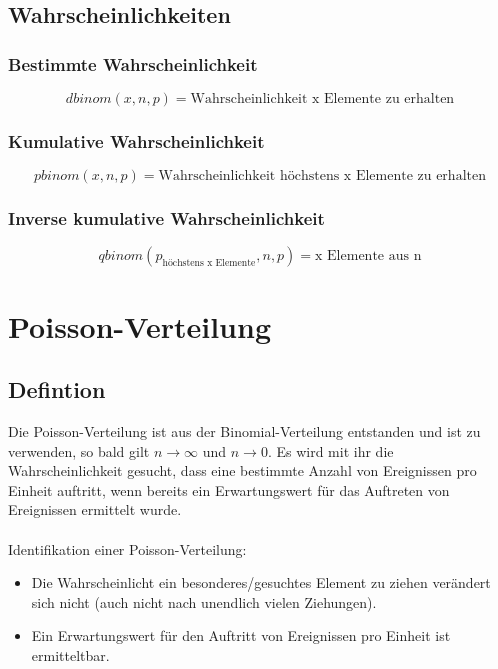 \documentclass[a4paper,10pt]{article}
\begin{document}
\subsection{Wahrscheinlichkeiten}
\subsubsection{Bestimmte Wahrscheinlichkeit}
\begin{equation}
  \label{eq:3}
  dbinom(x, n, p) = \text{Wahrscheinlichkeit x Elemente zu erhalten}
\end{equation}

\subsubsection{Kumulative Wahrscheinlichkeit}
\begin{equation}
  \label{eq:4}
  pbinom(x, n, p) = \text{Wahrscheinlichkeit höchstens x Elemente zu erhalten}
\end{equation}

\subsubsection{Inverse kumulative Wahrscheinlichkeit}
\begin{equation}
  \label{eq:5}
  qbinom(p_{\text{höchstens x Elemente}}, n, p) = \text{x Elemente aus n}
\end{equation}

\section{Poisson-Verteilung}
\subsection{Defintion}
Die Poisson-Verteilung ist aus der Binomial-Verteilung entstanden und
ist zu verwenden, so bald gilt $ n \rightarrow \infty $ und $ n
\rightarrow 0 $. Es wird mit ihr die Wahrscheinlichkeit gesucht, dass
eine bestimmte Anzahl von Ereignissen pro Einheit auftritt, wenn
bereits ein Erwartungswert für das Auftreten von Ereignissen ermittelt
wurde.
\\\\
Identifikation einer Poisson-Verteilung:
\begin{itemize}
\item Die Wahrscheinlicht ein besonderes/gesuchtes Element zu ziehen
  verändert sich nicht (auch nicht nach unendlich vielen Ziehungen).
\item Ein Erwartungswert für den Auftritt von Ereignissen pro Einheit
  ist ermitteltbar.
\end{itemize}
\end{document}
